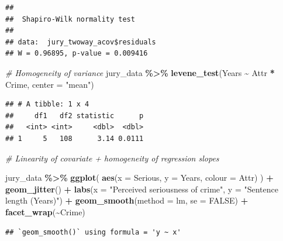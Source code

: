 \documentclass[
]{book}
\newenvironment{Shaded}{\begin{snugshade}}{\end{snugshade}}
\newcommand{\AttributeTok}[1]{\textcolor[rgb]{0.13,0.29,0.53}{#1}}
\newcommand{\CommentTok}[1]{\textcolor[rgb]{0.56,0.35,0.01}{\textit{#1}}}
\newcommand{\ConstantTok}[1]{\textcolor[rgb]{0.56,0.35,0.01}{#1}}
\newcommand{\FunctionTok}[1]{\textcolor[rgb]{0.13,0.29,0.53}{\textbf{#1}}}
\newcommand{\NormalTok}[1]{#1}
\newcommand{\SpecialCharTok}[1]{\textcolor[rgb]{0.81,0.36,0.00}{\textbf{#1}}}
\newcommand{\StringTok}[1]{\textcolor[rgb]{0.31,0.60,0.02}{#1}}
\begin{document}
\begin{verbatim}
## 
##  Shapiro-Wilk normality test
## 
## data:  jury_twoway_acov$residuals
## W = 0.96895, p-value = 0.009416
\end{verbatim}

\begin{Shaded}
\begin{Highlighting}[]
\CommentTok{\# Homogeneity of variance}
\NormalTok{jury\_data }\SpecialCharTok{\%\textgreater{}\%}
  \FunctionTok{levene\_test}\NormalTok{(Years }\SpecialCharTok{\textasciitilde{}}\NormalTok{ Attr }\SpecialCharTok{*}\NormalTok{ Crime, }\AttributeTok{center =} \StringTok{"mean"}\NormalTok{)}
\end{Highlighting}
\end{Shaded}

\begin{verbatim}
## # A tibble: 1 x 4
##     df1   df2 statistic      p
##   <int> <int>     <dbl>  <dbl>
## 1     5   108      3.14 0.0111
\end{verbatim}

\begin{Shaded}
\begin{Highlighting}[]
\CommentTok{\# Linearity of covariate + homogeneity of regression slopes}

\NormalTok{jury\_data }\SpecialCharTok{\%\textgreater{}\%}
  \FunctionTok{ggplot}\NormalTok{(}
    \FunctionTok{aes}\NormalTok{(}\AttributeTok{x =}\NormalTok{ Serious, }\AttributeTok{y =}\NormalTok{ Years, }\AttributeTok{colour =}\NormalTok{ Attr)}
\NormalTok{  ) }\SpecialCharTok{+}
  \FunctionTok{geom\_jitter}\NormalTok{() }\SpecialCharTok{+} 
  \FunctionTok{labs}\NormalTok{(}\AttributeTok{x =} \StringTok{"Perceived seriousness of crime"}\NormalTok{, }\AttributeTok{y =} \StringTok{"Sentence length (Years)"}\NormalTok{) }\SpecialCharTok{+}
  \FunctionTok{geom\_smooth}\NormalTok{(}\AttributeTok{method =}\NormalTok{ lm, }\AttributeTok{se =} \ConstantTok{FALSE}\NormalTok{) }\SpecialCharTok{+}
  \FunctionTok{facet\_wrap}\NormalTok{(}\SpecialCharTok{\textasciitilde{}}\NormalTok{Crime)}
\end{Highlighting}
\end{Shaded}

\begin{verbatim}
## `geom_smooth()` using formula = 'y ~ x'
\end{verbatim}
\end{document}
